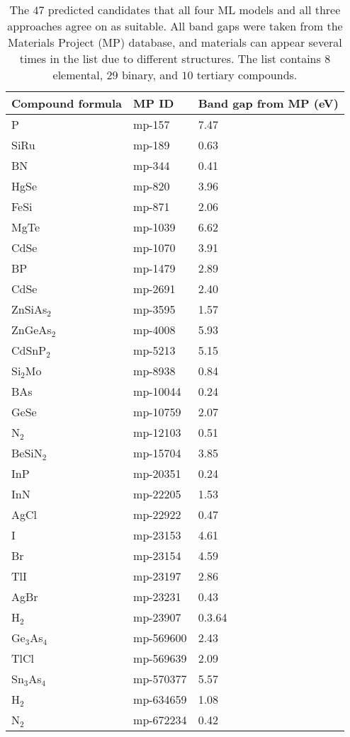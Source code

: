 \begin{center}
\begin{longtable}{M{3.5cm} M{6.5cm} M{2.0cm}}
\caption{The $47$ predicted candidates that all four ML models and all three approaches agree on as suitable. All band gaps were taken from the Materials Project (MP) database, and materials can appear several times in the list due to different structures. The list contains $8$ elemental, $29$ binary, and $10$ tertiary compounds.}
\label{tab:04-probability-candidates}  
\hline
Compound formula & MP ID & Band gap from MP (eV) \\
\hline
  P & mp-157 & 7.47\\
  SiRu & mp-189 & 0.63\\
  BN & mp-344 & 0.41\\
  HgSe & mp-820 & 3.96\\
  FeSi & mp-871 & 2.06\\
  MgTe & mp-1039 & 6.62\\
  CdSe & mp-1070 & 3.91\\
  BP & mp-1479 & 2.89\\
  CdSe & mp-2691 & 2.40\\
  ZnSiAs$_2$ & mp-3595 & 1.57\\
  ZnGeAs$_2$ & mp-4008 & 5.93\\
  CdSnP$_2$ & mp-5213 & 5.15\\
  Si$_2$Mo & mp-8938 & 0.84\\
  BAs & mp-10044 & 0.24\\
  GeSe & mp-10759 & 2.07\\
  N$_2$ & mp-12103 & 0.51\\
  BeSiN$_2$ & mp-15704 & 3.85\\
  InP & mp-20351 & 0.24\\
  InN & mp-22205 & 1.53\\
  AgCl & mp-22922 & 0.47\\
  I & mp-23153 & 4.61\\
  Br & mp-23154 & 4.59\\
  TlI & mp-23197 & 2.86\\
  AgBr & mp-23231 & 0.43\\
  H$_2$ & mp-23907 & 0.3.64\\
  Ge$_3$As$_4$ & mp-569600 & 2.43\\
  TlCl & mp-569639 & 2.09\\
  Sn$_3$As$_4$ & mp-570377 & 5.57\\
  H$_2$ & mp-634659 & 1.08\\
  N$_2$ & mp-672234 & 0.42\\

\end{longtable}
\end{center}
